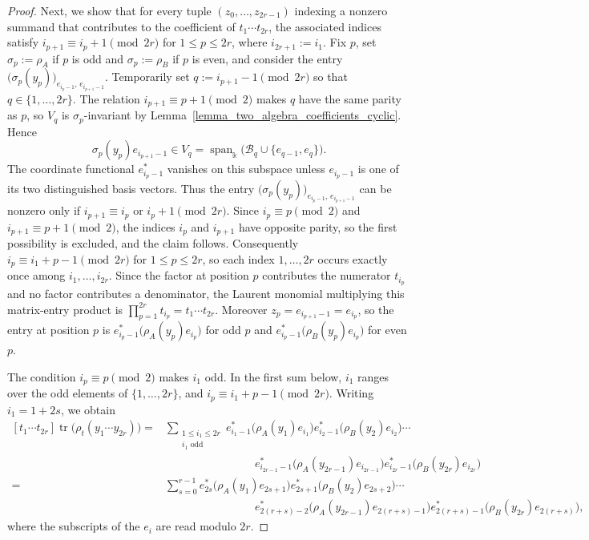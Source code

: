\begin{proof}
    Next, we show that for every tuple \((z_0,\ldots,z_{2r-1})\) indexing a nonzero summand that contributes to the coefficient of \(t_1\cdots t_{2r}\), the associated indices satisfy \(i_{p+1}\equiv i_p+1\pmod{2r}\) for \(1\leq p\leq2r\), where \(i_{2r+1}:=i_1\).
    Fix \(p\), set \(\sigma_p:=\rho_A\) if \(p\) is odd and \(\sigma_p:=\rho_B\) if \(p\) is even, and consider the entry \(\bigl(\sigma_p(y_p)\bigr)_{e_{i_p-1},\,e_{i_{p+1}-1}}\).
    Temporarily set \(q:=i_{p+1}-1\pmod{2r}\) so that \(q\in\{1,\ldots,2r\}\).
    The relation \(i_{p+1}\equiv p+1\pmod2\) makes \(q\) have the same parity as \(p\), so \(V_q\) is \(\sigma_p\)-invariant by Lemma~\ref{lemma_two_algebra_coefficients_cyclic}.
    Hence
    \[
        \sigma_p(y_p)e_{i_{p+1}-1}\in V_q
        =\operatorname{span}_{\Bbbk}\bigl(\mathcal{B}_q\cup\{e_{q-1},e_q\}\bigr).
    \]
    The coordinate functional \(e_{i_p-1}^*\) vanishes on this subspace unless \(e_{i_p-1}\) is one of its two distinguished basis vectors.
    Thus the entry \(\bigl(\sigma_p(y_p)\bigr)_{e_{i_p-1},\,e_{i_{p+1}-1}}\) can be nonzero only if \(i_{p+1}\equiv i_p\) or \(i_p+1\pmod{2r}\).
    Since \(i_p\equiv p\pmod2\) and \(i_{p+1}\equiv p+1\pmod2\), the indices \(i_p\) and \(i_{p+1}\) have opposite parity, so the first possibility is excluded, and the claim follows.
    Consequently \(i_p\equiv i_1+p-1\pmod{2r}\) for \(1\leq p\leq2r\), so each index \(1,\ldots,2r\) occurs exactly once among \(i_1,\ldots,i_{2r}\).
    Since the factor at position \(p\) contributes the numerator \(t_{i_p}\) and no factor contributes a denominator, the Laurent monomial multiplying this matrix-entry product is \(\prod_{p=1}^{2r}t_{i_p}=t_1\cdots t_{2r}\).
    Moreover \(z_p=e_{i_{p+1}-1}=e_{i_p}\), so the entry at position \(p\) is \(e_{i_p-1}^*\bigl(\rho_A(y_p)e_{i_p}\bigr)\) for odd \(p\) and \(e_{i_p-1}^*\bigl(\rho_B(y_p)e_{i_p}\bigr)\) for even \(p\).

    The condition \(i_p\equiv p\pmod2\) makes \(i_1\) odd. In the first sum below, \(i_1\) ranges over the odd elements of \(\{1,\ldots,2r\}\), and \(i_p\equiv i_1+p-1\pmod{2r}\). Writing \(i_1=1+2s\), we obtain
    \[
        \begin{aligned}
            [t_1\cdots t_{2r}]\operatorname{tr}\bigl(\rho_t(y_1\cdots y_{2r})\bigr)
            ={}&\sum_{\substack{1\leq i_1\leq2r\\i_1\text{ odd}}}
            e_{i_1-1}^*\bigl(\rho_A(y_1)e_{i_1}\bigr)
            e_{i_2-1}^*\bigl(\rho_B(y_2)e_{i_2}\bigr)\cdots\\
            &\qquad\qquad\qquad\qquad
            e_{i_{2r-1}-1}^*\bigl(\rho_A(y_{2r-1})e_{i_{2r-1}}\bigr)
            e_{i_{2r}-1}^*\bigl(\rho_B(y_{2r})e_{i_{2r}}\bigr)\\
            ={}&\sum_{s=0}^{r-1}
            e_{2s}^*\bigl(\rho_A(y_1)e_{2s+1}\bigr)
            e_{2s+1}^*\bigl(\rho_B(y_2)e_{2s+2}\bigr)\cdots\\
            &\qquad\qquad\qquad\qquad
            e_{2(r+s)-2}^*\bigl(\rho_A(y_{2r-1})e_{2(r+s)-1}\bigr)
            e_{2(r+s)-1}^*\bigl(\rho_B(y_{2r})e_{2(r+s)}\bigr),
        \end{aligned}
    \]
    where the subscripts of the \(e_i\) are read modulo \(2r\).


\end{proof}
